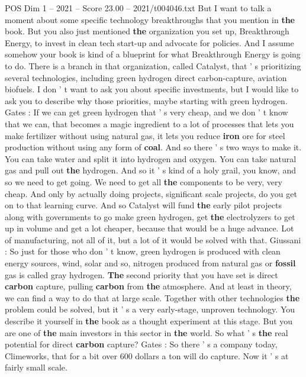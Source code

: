 \begin{textsample}{POS Dim 1 – 2021 – Score 23.00 – 2021/t004046.txt}
But I want to talk a moment about some specific technology breakthroughs that you mention in \textbf{the} book.
But you also just mentioned \textbf{the} organization you set up, Breakthrough Energy, to invest in clean tech start-up and advocate for policies.
And I assume somehow your book is kind of a blueprint for what Breakthrough Energy is going to do.
There is a branch in that organization, called Catalyst, that ' s prioritizing several technologies, including green hydrogen direct carbon-capture, aviation biofuels.
I don ' t want to ask you about specific investments, but I would like to ask you to describe why those priorities, maybe starting with green hydrogen.
Gates : If we can get green hydrogen that ' s very cheap, and we don ' t know that we can, that becomes a magic ingredient to a lot of processes that lets you make fertilizer without using natural gas, it lets you reduce \textbf{iron} ore for steel production without using any form of \textbf{coal}.
And so there ' s two ways to make it.
You can take water and split it into hydrogen and oxygen.
You can take natural gas and pull out \textbf{the} hydrogen.
And so it ' s kind of a holy grail, you know, and so we need to get going.
We need to get all \textbf{the} components to be very, very cheap.
And only by actually doing projects, significant scale projects, do you get on to that learning curve.
And so Catalyst will fund \textbf{the} early pilot projects along with governments to go make green hydrogen, get \textbf{the} electrolyzers to get up in volume and get a lot cheaper, because that would be a huge advance.
Lot of manufacturing, not all of it, but a lot of it would be solved with that.
Giussani : So just for those who don ' t know, green hydrogen is produced with clean energy sources, wind, solar and so, nitrogen produced from natural gas or \textbf{fossil} gas is called gray hydrogen. \textbf{The} second priority that you have set is direct \textbf{carbon} capture, pulling \textbf{carbon} from \textbf{the} atmosphere.
And at least in theory, we can find a way to do that at large scale.
Together with other technologies \textbf{the} problem could be solved, but it ' s a very early-stage, unproven technology.
You describe it yourself in \textbf{the} book as a thought experiment at this stage.
But you are one of \textbf{the} main investors in this sector in \textbf{the} world.
So what ' s \textbf{the} real potential for direct \textbf{carbon} capture?
Gates : So there ' s a company today, Climeworks, that for a bit over 600 dollars a ton will do capture.
Now it ' s at fairly small scale.

\end{textsample}
